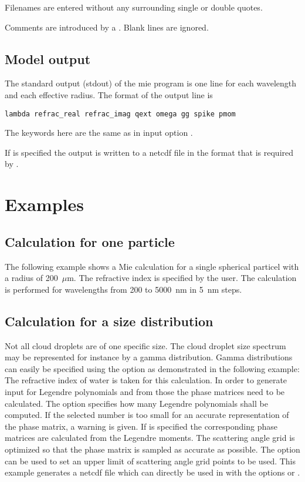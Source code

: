 Filenames are entered without any surrounding single or double quotes.

Comments are introduced by a \code{\#}. Blank lines are ignored.

\subsection{Model output}

The standard output (stdout) of the mie program is one line for each 
wavelength and each effective radius.
The format of the output line is
\begin{Verbatim}[fontsize=\footnotesize, frame=single, samepage=true]   
  lambda refrac_real refrac_imag qext omega gg spike pmom
\end{Verbatim}
The keywords here are the same as in input option .

If  is specified the output is written to a
netcdf file in the format that is required by .

\section{Examples}

\subsection{Calculation for one particle}

The following example shows a Mie calculation for a single spherical
particel with a radius of 200~$\mu$m. The refractive index is
specified by the user. The calculation is performed for wavelengths
from 200 to 5000~nm in 5~nm steps.

\subsection{Calculation for a size distribution}

Not all cloud droplets are of one specific size. The cloud droplet
size spectrum may be represented for instance by a gamma
distribution. Gamma distributions can easily be specified using the
option   as
demonstrated in the following example:
The refractive index of water is taken for this calculation. In order
to generate input for  Legendre polynomials and from
those the phase matrices need to be calculated. The option
 specifies how many Legendre polynomials shall be
computed. If the selected number is too small for an accurate
representation of the phase matrix, a warning is given. If
 is specified the corresponding phase
matrices are calculated from the Legendre moments. The scattering
angle grid is optimized so that the phase matrix is sampled as
accurate as possible. The option  can be used to set
an upper limit of scattering angle grid points to be used. 
This example generates a netcdf file which can directly be used in
 with the options  or
.


